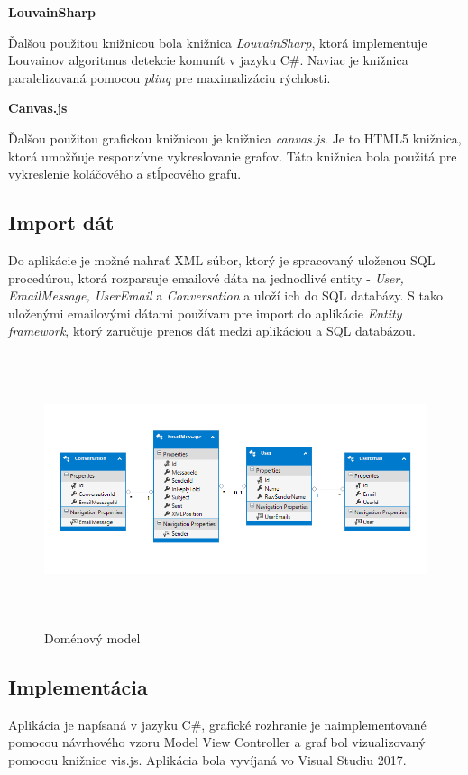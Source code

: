\documentclass[slovak,master,public,dept460,male,cpdeclaration,oneside]{diploma}
\begin{document}
\textbf{LouvainSharp}


Ďalšou použitou knižnicou bola knižnica \textit{LouvainSharp}, ktorá implementuje Louvainov algoritmus detekcie komunít v jazyku C\#. Naviac je knižnica paralelizovaná pomocou \textit{plinq} pre maximalizáciu rýchlosti. \cite{louvain}

\hfill \break

\textbf{Canvas.js}

Ďalšou použitou grafickou knižnicou je knižnica \textit{canvas.js}. Je to HTML5 knižnica, ktorá umožňuje responzívne vykresľovanie grafov. Táto knižnica bola použitá pre vykreslenie koláčového a stĺpcového grafu. \cite{canvas}



\subsection{Import dát}
Do aplikácie je možné nahrať XML súbor, ktorý je spracovaný uloženou SQL procedúrou, ktorá rozparsuje emailové dáta na jednodlivé entity - \textit{User, EmailMessage, UserEmail} a \textit{Conversation} a uloží ich do SQL databázy. S tako uloženými emailovými dátami používam pre import do aplikácie \textit{Entity framework}, ktorý zaručuje prenos dát medzi aplikáciou a SQL databázou.


\begin{figure}[H]
\centering
\includegraphics[width=16cm, height=8cm]{figures/domain_model}
\caption{Doménový model}
\end{figure}




\subsection{Implementácia}
Aplikácia je napísaná v jazyku C\#, grafické rozhranie je naimplementované pomocou návrhového vzoru Model View Controller a graf bol vizualizovaný pomocou knižnice vis.js. Aplikácia bola vyvíjaná vo Visual Studiu 2017.
\end{document}
